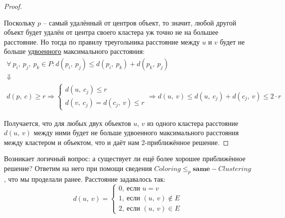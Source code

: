 \documentclass[a4paper,12pt]{article}
\begin{document}
\begin{proof}
\begin{center}
    \end{center}
    
    Поскольку $p$ -- самый удалённый от центров объект, то значит, любой другой объект будет удалён от центра своего кластера уж точно не на большее расстояние. Но тогда по правилу треугольника расстояние между $u$ и $v$ будет не больше \underline{удвоенного} максимального расстояния:
    \begin{gather*}
        \forall\ p_i,\ p_j,\ p_k \in P: d(p_i,\ p_j) \leqslant d(p_i,\ p_k) + d(p_k,\ p_j) \\ \Downarrow \\
        d(p,\ c) \geqslant r \Longrightarrow \begin{cases}d(u,\ c_j) \leqslant r\\d(v,\ c_j) = d(c_j,\ v) \leqslant r\end{cases} \Longrightarrow d(u,\ v) \leqslant d(u,\ c_j) + d(c_j,\ v) \leqslant 2 \cdot r
    \end{gather*}
    
    Получается, что для любых двух объектов $u$, $v$ из одного кластера расстояние $d(u,\ v)$ между ними будет не больше удвоенного максимального расстояния между кластером и объектом, что и даёт нам 2-приближённое решение.
\end{proof}

Возникает логичный вопрос: а существует ли ещё более хорошее приближённое решение? Ответим на него при помощи сведения $Coloring \leqslant_p \textbf{same}-Clustering$, что мы проделали ранее. Расстояние задавалось так:
\[d(u,\ v) = \begin{cases}0,\ \text{если }u = v\\ 1,\ \text{если }(u,\ v) \notin E\\ 2,\ \text{если } (u,\ v) \in E\end{cases}\]
\end{document}
